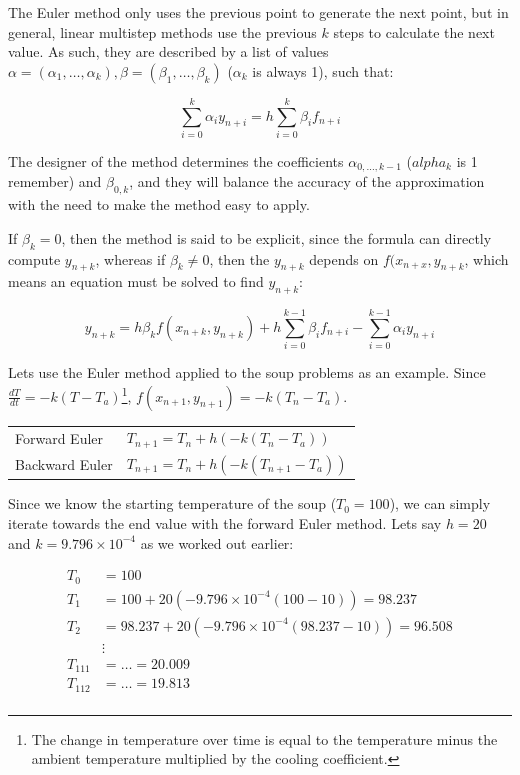 The Euler method only uses the previous point to generate the next
point, but in general, linear multistep methods use the previous $k$
steps to calculate the next value. As such, they are described by a
list of values $\alpha = (\alpha_1, \dots, \alpha_k), \beta =
(\beta_1,\dots,\beta_k)$ ($\alpha_k$ is always 1), such that:

\[
  \sum\limits^k_{i=0}\alpha_iy_{n+i} = h \sum\limits^k_{i=0}\beta_if_{n+i}
\]

The designer of the method determines the coefficients
$\alpha_{0,\dots,k-1}$ ($alpha_k$ is 1 remember) and $\beta_{0, k}$,
and they will balance the accuracy of the approximation with the need
to make the method easy to apply.

If $\beta_k = 0$, then the method is said to be explicit, since the
formula can directly compute $y_{n + k}$, whereas if $\beta_k \neq 0$,
then the $y_{n+k}$ depends on $f(x_{n+x},y_{n+k}$, which means an
equation must be solved to find $y_{n+k}$:

\[
  y_{n+k} = h\beta_kf(x_{n+k},y_{n+k})
              + h\sum\limits^{k-1}_{i=0}\beta_if_{n+i}
              - \sum\limits^{k-1}_{i=0}\alpha_iy_{n+i}
\]

Lets use the Euler method applied to the soup problems as an
example. Since $\frac{dT}{dt} = -k(T - T_a)$\footnote{The change in
temperature over time is equal to the temperature minus the ambient
temperature multiplied by the cooling coefficient.},
$f(x_{n+1},y_{n+1}) = -k(T_n - T_a)$.

\begin{center}
\begin{tabular}{ll}
  Forward Euler & $T_{n+1} = T_n + h(-k(T_n - T_a))$\\
  Backward Euler & $T_{n+1} = T_n + h(-k(T_{n+1} - T_a))$\\
\end{tabular}
\end{center}

Since we know the starting temperature of the soup ($T_0 = 100$), we
can simply iterate towards the end value with the forward Euler
method. Lets say $h = 20$ and $k = 9.796\times10^{-4}$ as we worked
out earlier:

\[
\begin{split}
  T_0 &= 100\\
  T_1 &= 100 + 20(-9.796\times10^{-4}(100 - 10)) = 98.237\\
  T_2 &= 98.237 + 20(-9.796\times10^{-4}(98.237 - 10)) = 96.508\\
  &\vdots\\
  T_{111} &= \dots = 20.009\\
  T_{112} &= \dots = 19.813\\
\end{split}
\]

